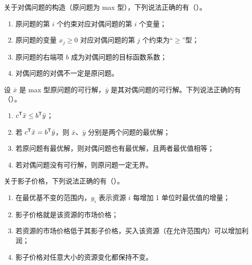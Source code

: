 \Q[\diff{基础·K2}] 关于对偶问题的构造（原问题为 max 型），下列说法正确的有（\quad）。
\begin{figure}[!htbp]\centering
{}
\end{figure}
\begin{enumerate}[label=\Alph*.,leftmargin=2em]
  \item 原问题的第 $i$ 个约束对应对偶问题的第 $i$ 个变量；
  \item 原问题的变量 $x_j\ge0$ 对应对偶问题的第 $j$ 个约束为“$\ge$”型；
  \item 原问题的右端项 $b$ 成为对偶问题的目标函数系数；
  \item 对偶问题的对偶不一定是原问题。
\end{enumerate}

\Q[\diff{基础·K3}] 设 $\bar x$ 是 max 型原问题的可行解，$\bar y$ 是其对偶问题的可行解。下列说法正确的有（\quad）。
\begin{enumerate}[label=\Alph*.,leftmargin=2em]
  \item $c^{\mathsf T}\bar x\le b^{\mathsf T}\bar y$；
  \item 若 $c^{\mathsf T}\bar x=b^{\mathsf T}\bar y$，则 $\bar x$、$\bar y$ 分别是两个问题的最优解；
  \item 若原问题有最优解，则对偶问题也有最优解，且两者最优值相等；
  \item 若对偶问题没有可行解，则原问题一定无界。
\end{enumerate}

\Q[\diff{基础·K5}] 关于影子价格，下列说法正确的有（\quad）。
\begin{enumerate}[label=\Alph*.,leftmargin=2em]
  \item 在最优基不变的范围内，$y_i$ 表示资源 $i$ 每增加 1 单位时最优值的增量；
  \item 影子价格就是该资源的市场价格；
  \item 若资源的市场价格低于其影子价格，买入该资源（在允许范围内）可以增加利润；
  \item 影子价格对任意大小的资源变化都保持不变。
\end{enumerate}


